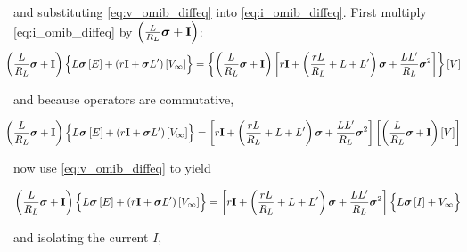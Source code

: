 	\noindent and substituting \eqref{eq:v_omib_diffeq} into \eqref{eq:i_omib_diffeq}. First multiply \eqref{eq:i_omib_diffeq} by $\left(\frac{L}{R_L}\boldsymbol{\sigma} + \mathbf{I}\right)$:
\begin{equation}
	\hspace{-3mm} \left(\dfrac{L}{R_L}\dpo + \mathbf{I}\right)\left\{\raisebox{4mm}{} L\dpo \left[E\right] + \left(r\mathbf{I} + \dpo L'\right)\left[V_\infty\right]\right\} = \left\{\left(\dfrac{L}{R_L}\dpo + \mathbf{I}\right)\left[r\mathbf{I} + \left(\dfrac{rL}{R_L} + L + L'\right)\dpo + \dfrac{LL'}{R_L}\ndpo{2}\right]\right\}\left[ V\right]
\end{equation}

	\noindent and because operators are commutative,

\begin{equation}
	\hspace{-3mm} \left(\dfrac{L}{R_L}\dpo + \mathbf{I}\right)\left\{\raisebox{4mm}{} L\dpo \left[E\right] + \left(r\mathbf{I} + \dpo L'\right)\left[V_\infty\right]\right\} = \left[r\mathbf{I} + \left(\dfrac{rL}{R_L} + L + L'\right)\dpo + \dfrac{LL'}{R_L}\ndpo{2}\right]\left[ \left(\dfrac{L}{R_L}\dpo + \mathbf{I}\right)\left[V\right]\right]
\end{equation}

	\noindent now use \eqref{eq:v_omib_diffeq} to yield

\begin{equation}
	\left(\dfrac{L}{R_L}\dpo + \mathbf{I}\right)\left\{\raisebox{4mm}{} L\dpo \left[E\right] + \left(r\mathbf{I} + \dpo L'\right)\left[V_\infty\right]\right\} = \left[r\mathbf{I} + \left(\dfrac{rL}{R_L} + L + L'\right)\dpo + \dfrac{LL'}{R_L}\ndpo{2}\right]\left\{\raisebox{4mm}{} L\dpo\left[I\right] + V_\infty\right\}
\end{equation}

	\noindent and isolating the current $I$,

